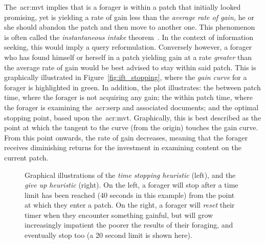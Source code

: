 The~\gls{acr:mvt} implies that is a forager is within a patch that initially looked promising, yet is yielding a rate of gain less than the \emph{average rate of gain,} he or she should abandon the patch and then move to another one. This phenomenon is often called the \emph{instantaneous intake} theorem~\cite{stephens1986foraging_theory}. In the context of information seeking, this would imply a query reformulation. Conversely however, a forager who has found himself or herself in a patch yielding gain at a rate \emph{greater} than the average rate of gain would be best advised to stay within said patch. This is graphically illustrated in Figure~\ref{fig:ift_stopping}, where the \emph{gain curve} for a forager is highlighted in {\color{dmax_green}green.} In addition, the plot illustrates:  the between patch time, where the forager is not acquiring any gain;  the within patch time, where the forager is examining the~\gls{acr:serp} and associated documents; and  the optimal stopping point, based upon the~\gls{acr:mvt}. Graphically, this is best described as the point at which the tangent to the curve (from the origin) touches the gain curve. From this point onwards, the rate of gain decreases, meaning that the forager receives diminishing returns for the investment in examining content on the current patch.

\begin{figure}[t!]
    \centering
    \caption[Time-based stopping heuristics]{Graphical illustrations of the \emph{time stopping heuristic} (left), and the \emph{give up heuristic} (right). On the left, a forager will stop after a time limit has been reached (40 seconds in this example) from the point at which they enter a patch. On the right, a forager will \emph{reset} their timer when they encounter something gainful, but will grow increasingly impatient the poorer the results of their foraging, and eventually stop too (a 20 second limit is shown here).}
    \label{fig:gut}
\end{figure}

